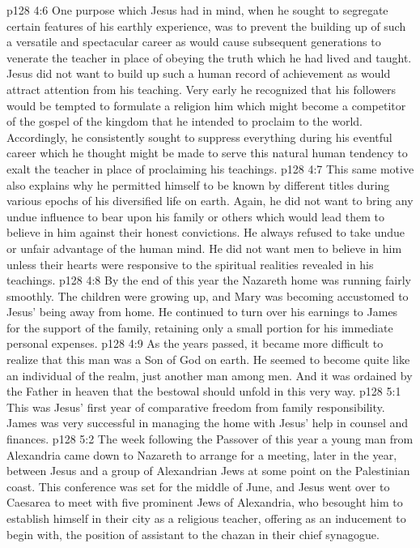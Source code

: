 \vs p128 4:6 One purpose which Jesus had in mind, when he sought to segregate certain features of his earthly experience, was to prevent the building up of such a versatile and spectacular career as would cause subsequent generations to venerate the teacher in place of obeying the truth which he had lived and taught. Jesus did not want to build up such a human record of achievement as would attract attention from his teaching. Very early he recognized that his followers would be tempted to formulate a religion  him which might become a competitor of the gospel of the kingdom that he intended to proclaim to the world. Accordingly, he consistently sought to suppress everything during his eventful career which he thought might be made to serve this natural human tendency to exalt the teacher in place of proclaiming his teachings.
\vs p128 4:7 This same motive also explains why he permitted himself to be known by different titles during various epochs of his diversified life on earth. Again, he did not want to bring any undue influence to bear upon his family or others which would lead them to believe in him against their honest convictions. He always refused to take undue or unfair advantage of the human mind. He did not want men to believe in him unless their hearts were responsive to the spiritual realities revealed in his teachings.
\pc \vs p128 4:8 By the end of this year the Nazareth home was running fairly smoothly. The children were growing up, and Mary was becoming accustomed to Jesus’ being away from home. He continued to turn over his earnings to James for the support of the family, retaining only a small portion for his immediate personal expenses.
\vs p128 4:9 As the years passed, it became more difficult to realize that this man was a Son of God on earth. He seemed to become quite like an individual of the realm, just another man among men. And it was ordained by the Father in heaven that the bestowal should unfold in this very way.
\vs p128 5:1 This was Jesus’ first year of comparative freedom from family responsibility. James was very successful in managing the home with Jesus’ help in counsel and finances.
\pc \vs p128 5:2 The week following the Passover of this year a young man from Alexandria came down to Nazareth to arrange for a meeting, later in the year, between Jesus and a group of Alexandrian Jews at some point on the Palestinian coast. This conference was set for the middle of June, and Jesus went over to Caesarea to meet with five prominent Jews of Alexandria, who besought him to establish himself in their city as a religious teacher, offering as an inducement to begin with, the position of assistant to the chazan in their chief synagogue.
